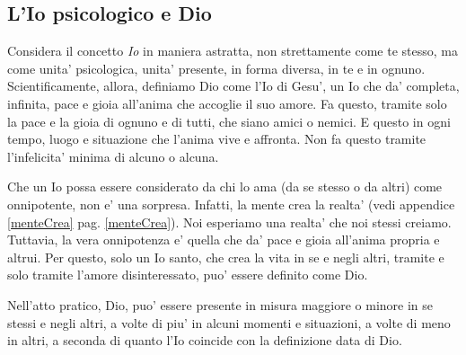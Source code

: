 %
%

\subsection{L'Io psicologico e Dio}

\label{DioScientificamentePoesia}
\label{DioScientificamentePsicologicamente}

Considera il concetto \emph{Io} in maniera astratta, non strettamente come te stesso, ma come unita' psicologica, unita' presente, in forma diversa, in te e in ognuno. Scientificamente, allora, definiamo Dio come l'Io di \mbox{Gesu'}, un Io che da' completa, infinita, pace e gioia all'\mbox{anima} che accoglie il suo amore. Fa questo, tramite solo la pace e la gioia di ognuno e di tutti, che siano amici o nemici. E questo in ogni tempo, luogo e situazione che l'anima vive e affronta. Non fa questo tramite l'infelicita' minima di alcuno o alcuna. 

Che un Io possa essere considerato da chi lo ama (da se stesso o da altri) come onnipotente, non e' una sorpresa. Infatti, la mente crea la realta' (vedi appendice \ref{menteCrea} pag. \ref{menteCrea}). Noi esperiamo una realta' che noi stessi creiamo. Tuttavia, la vera onnipotenza e' quella che da' pace e gioia all'anima propria e altrui. Per questo, solo un Io santo, che crea la vita in se e negli altri, tramite e solo tramite l'amore disinteressato, puo' essere definito come Dio.

Nell'atto pratico, Dio, puo' essere presente in misura maggiore o minore in se stessi e negli altri, a volte di piu' in alcuni momenti e situazioni, a volte di meno in altri, a seconda di quanto l'Io coincide con la definizione data di Dio.

